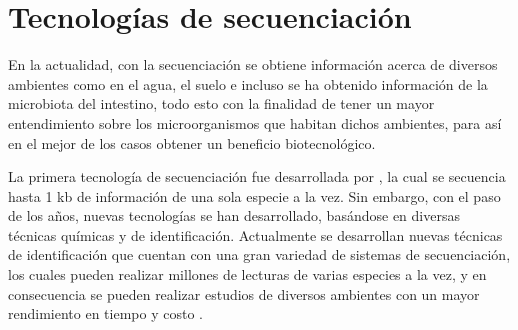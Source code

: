 \documentclass[12pt,letterpaper,oneside]{report}
\begin{document}
\section{Tecnologías de secuenciación}
En la actualidad, con la secuenciación se obtiene información acerca de diversos ambientes como en el agua, el suelo e incluso se ha obtenido información de la microbiota del intestino, todo esto con la finalidad de tener un mayor entendimiento sobre los microorganismos que habitan dichos ambientes, para así en el mejor de los casos obtener un beneficio biotecnológico.
\par
La primera tecnología de secuenciación fue desarrollada por \textcite{Sanger1977}, la cual se secuencia hasta 1 kb de información de una sola especie a la vez. Sin embargo, con el paso de los años, nuevas tecnologías se han desarrollado, basándose en diversas técnicas químicas y de identificación. Actualmente se desarrollan  nuevas técnicas de identificación que cuentan con una gran variedad de sistemas de secuenciación, los cuales pueden realizar millones de lecturas de varias especies a la vez, y en consecuencia se pueden realizar estudios de diversos ambientes con un mayor rendimiento en tiempo y costo \autocite{Shokralla2012}.
\end{document}
